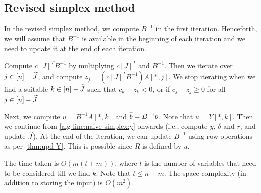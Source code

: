 \subsection{Revised simplex method}

In the revised simplex method, we compute $B^{-1}$ in the first iteration.
Henceforth, we will assume that $B^{-1}$ is available in the beginning of each iteration
and we need to update it at the end of each iteration.

Compute $c[J]^TB^{-1}$ by multiplying $c[J]^T$ and $B^{-1}$.
Then we iterate over $j \in [n] - \widetilde{J}$, and compute $z_j = (c[J]^TB^{-1})A[*,j]$.
We stop iterating when we find a suitable $k \in [n] - \widetilde{J}$ such that $c_k - z_k < 0$,
or if $c_j - z_j \ge 0$ for all $j \in [n] - \widetilde{J}$.

Next, we compute $u = B^{-1}A[*,k]$ and $\overline{b} = B^{-1}b$. Note that $u = Y[*,k]$.
Then we continue from \cref{alg-line:naive-simplex:y} onwards
(i.e., compute $y$, $\delta$ and $r$, and update $\widetilde{J}$).
At the end of the iteration, we can update $B^{-1}$ using row operations as per \cref{thm:upd-Y}.
This is possible since $R$ is defined by $u$.

The time taken is $O(m(t+m))$, where $t$ is the number of variables
that need to be considered till we find $k$. Note that $t \le n-m$.
The space complexity (in addition to storing the input) is $O(m^2)$.


